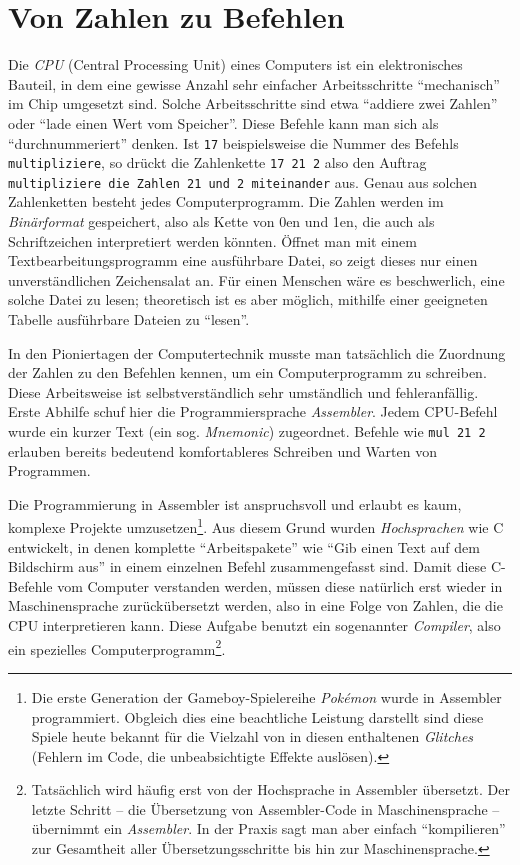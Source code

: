 \section{Von Zahlen zu Befehlen} \label{sec:assembly}
Die \emph{CPU} (Central Processing Unit) eines Computers ist ein elektronisches Bauteil, in dem eine gewisse Anzahl sehr einfacher Arbeitsschritte \enquote{mechanisch} im Chip umgesetzt sind. Solche Arbeitsschritte sind etwa \enquote{addiere zwei Zahlen} oder \enquote{lade einen Wert vom Speicher}. Diese Befehle kann man sich als \enquote{durchnummeriert} denken. Ist \texttt{17} beispielsweise die Nummer des Befehls \texttt{multipliziere}, so drückt die Zahlenkette \texttt{17 21 2} also den Auftrag \texttt{multipliziere die Zahlen 21 und 2 miteinander} aus. Genau aus solchen Zahlenketten besteht jedes Computerprogramm. Die Zahlen werden im \emph{Binärformat} gespeichert, also als Kette von 0en und 1en, die auch als Schriftzeichen interpretiert werden könnten. Öffnet man mit einem Textbearbeitungsprogramm eine ausführbare Datei, so zeigt dieses nur einen unverständlichen Zeichensalat an. Für einen Menschen wäre es beschwerlich, eine solche Datei zu lesen; theoretisch ist es aber möglich, mithilfe einer geeigneten Tabelle ausführbare Dateien zu \enquote{lesen}.

In den Pioniertagen der Computertechnik musste man tatsächlich die Zuordnung der Zahlen zu den Befehlen kennen, um ein Computerprogramm zu schreiben. Diese Arbeitsweise ist selbstverständlich sehr umständlich und fehleranfällig. Erste Abhilfe schuf hier die Programmiersprache \emph{Assembler}. Jedem CPU-Befehl wurde ein kurzer Text (ein sog. \emph{Mnemonic}) zugeordnet. Befehle wie \texttt{mul 21 2} erlauben bereits bedeutend komfortableres Schreiben und Warten von Programmen.

Die Programmierung in Assembler ist anspruchsvoll und erlaubt es kaum, komplexe Projekte umzusetzen\footnote{Die erste Generation der Gameboy-Spielereihe \emph{Pokémon} wurde in Assembler programmiert. Obgleich dies eine beachtliche Leistung darstellt sind diese Spiele heute bekannt für die Vielzahl von in diesen enthaltenen \emph{Glitches} (Fehlern im Code, die unbeabsichtigte Effekte auslösen).}. Aus diesem Grund wurden \emph{Hochsprachen} wie C entwickelt, in denen komplette \enquote{Arbeitspakete} wie \enquote{Gib einen Text auf dem Bildschirm aus} in einem einzelnen Befehl zusammengefasst sind. Damit diese C-Befehle vom Computer verstanden werden, müssen diese natürlich erst wieder in Maschinensprache zurückübersetzt werden, also in eine Folge von Zahlen, die die CPU interpretieren kann. Diese Aufgabe benutzt ein sogenannter \emph{Compiler}, also ein spezielles Computerprogramm\footnote{Tatsächlich wird häufig erst von der Hochsprache in Assembler übersetzt. Der letzte Schritt -- die Übersetzung von Assembler-Code in Maschinensprache -- übernimmt ein \emph{Assembler}. In der Praxis sagt man aber einfach \enquote{kompilieren} zur Gesamtheit aller Übersetzungsschritte bis hin zur Maschinensprache.}.


